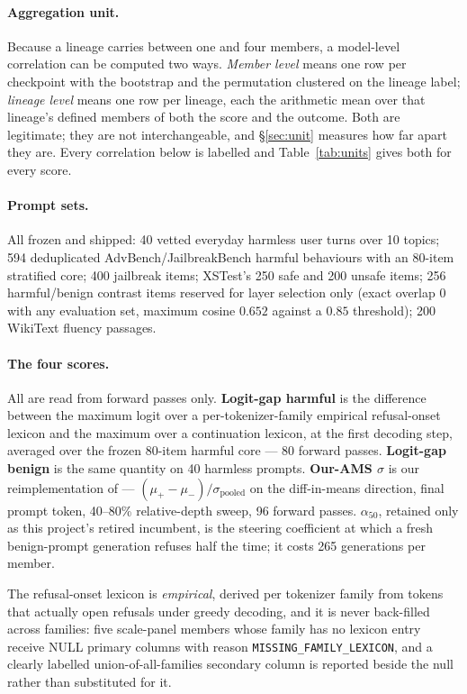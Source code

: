 \documentclass[11pt,letterpaper]{article}
\begin{document}
\paragraph{Aggregation unit.} Because a lineage carries between one and four members, a model-level correlation can be computed two ways. \emph{Member level} means one row per checkpoint with the bootstrap and the permutation clustered on the lineage label; \emph{lineage level} means one row per lineage, each the arithmetic mean over that lineage's defined members of both the score and the outcome. Both are legitimate; they are not interchangeable, and \S\ref{sec:unit} measures how far apart they are. Every correlation below is labelled and Table~\ref{tab:units} gives both for every score.

\paragraph{Prompt sets.} All frozen and shipped: 40 vetted everyday harmless user turns over 10 topics; 594 deduplicated AdvBench/JailbreakBench harmful behaviours with an 80-item stratified core; 400 jailbreak items; XSTest's 250 safe and 200 unsafe items; 256 harmful/benign contrast items reserved for layer selection only (exact overlap 0 with any evaluation set, maximum cosine $0.652$ against a $0.85$ threshold); 200 WikiText fluency passages.

\paragraph{The four scores.} All are read from forward passes only. \textbf{Logit-gap harmful} is the difference between the maximum logit over a per-tokenizer-family empirical refusal-onset lexicon and the maximum over a continuation lexicon, at the first decoding step, averaged over the frozen 80-item harmful core --- 80 forward passes. \textbf{Logit-gap benign} is the same quantity on 40 harmless prompts. \textbf{Our-AMS $\sigma$} is our reimplementation of \citet{Messenger2026} --- $(\mu_+ - \mu_-)/\sigma_{\text{pooled}}$ on the diff-in-means direction, final prompt token, 40--80\% relative-depth sweep, 96 forward passes. \textbf{$\alpha_{50}$}, retained only as this project's retired incumbent, is the steering coefficient at which a fresh benign-prompt generation refuses half the time; it costs 265 generations per member.

The refusal-onset lexicon is \emph{empirical}, derived per tokenizer family from tokens that actually open refusals under greedy decoding, and it is never back-filled across families: five scale-panel members whose family has no lexicon entry receive NULL primary columns with reason \texttt{MISSING\_FAMILY\_LEXICON}, and a clearly labelled union-of-all-families secondary column is reported beside the null rather than substituted for it.
\end{document}
